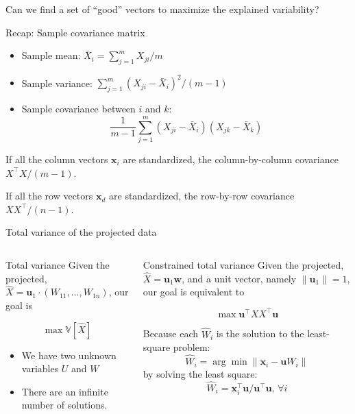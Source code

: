 \documentclass[
  ignorenonframetext,
  aspectratio=169]{beamer}
\begin{document}
\begin{frame}{Can we find a set of ``good'' vectors to maximize the
explained variability?}
\protect\hypertarget{can-we-find-a-set-of-good-vectors-to-maximize-the-explained-variability}{}
\begin{block}{Recap: Sample covariance matrix}
\protect\hypertarget{recap-sample-covariance-matrix}{}
\begin{itemize}
\item
  Sample mean: \(\bar{X}_{i} = \sum_{j=1}^{m} X_{ji} / m\)
\item
  Sample variance: \(\sum_{j=1}^{m} (X_{ji} - \bar{X}_{i})^{2} / (m-1)\)
\item
  Sample covariance between \(i\) and \(k\):
  \[\frac{1}{m-1}\sum_{j=1}^{m} (X_{ji} - \bar{X}_{i}) (X_{jk} - \bar{X}_{k})\]
\end{itemize}
\end{block}

If all the column vectors \(\mathbf{x}_{i}\) are standardized, the
column-by-column covariance \(X^{\top}X / (m-1)\).

If all the row vectors \(\mathbf{x}_{d}\) are standardized, the
row-by-row covariance \(X X^{\top} / (n-1)\).
\end{frame}

\begin{frame}{Total variance of the projected data}
\protect\hypertarget{total-variance-of-the-projected-data}{}
\begin{columns}[T]
\begin{column}{.45\textwidth}
\begin{block}{Total variance}
\protect\hypertarget{total-variance}{}
Given the projected,
\(\hat{X} = \mathbf{u}_{1} \cdot (W_{11},\ldots,W_{1n})\), our goal is

\[\max \mathbb{V}\!\left[\hat{X}\right]\]
\end{block}

\begin{itemize}
\item
  We have two unknown variables \(U\) and \(W\)
\item
  There are an infinite number of solutions.
\end{itemize}
\end{column}

\begin{column}{.45\textwidth}
\begin{block}{Constrained total variance}
\protect\hypertarget{constrained-total-variance}{}
Given the projected, \(\hat{X} = \mathbf{u}_{1} \mathbf{w}\), and a unit
vector, namely \(\|\mathbf{u}_{1}\|=1\), our goal is equivalent to

\[\max \mathbf{u}^{\top} X X^{\top} \mathbf{u}\]
\end{block}

Because each \(\hat{W}_{i}\) is the solution to the least-square
problem:
\[\hat{W}_{i} = \arg\min \|\mathbf{x}_{i} - \mathbf{u} W_{i}\|\] by
solving the least square:
\[\hat{W}_{i} = \mathbf{x}_{i}^{\top}\mathbf{u} / \mathbf{u}^{\top}\mathbf{u},\,\forall i\]
\end{column}
\end{columns}
\end{frame}
\end{document}
